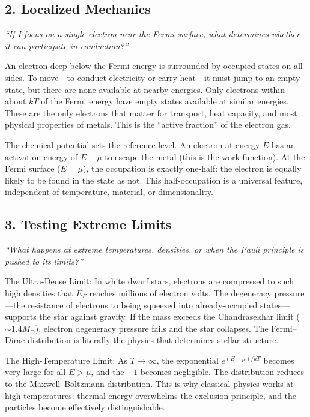 \documentclass[11pt,openright]{book}
\begin{document}
\subsection*{2. Localized Mechanics}
\textit{``If I focus on a single electron near the Fermi surface, what determines whether it can participate in conduction?''}

An electron deep below the Fermi energy is surrounded by occupied states on all sides. To move---to conduct electricity or carry heat---it must jump to an empty state, but there are none available at nearby energies. Only electrons within about $kT$ of the Fermi energy have empty states available at similar energies. These are the only electrons that matter for transport, heat capacity, and most physical properties of metals. This is the ``active fraction'' of the electron gas.

The chemical potential sets the reference level. An electron at energy $E$ has an activation energy of $E - \mu$ to escape the metal (this is the work function). At the Fermi surface ($E = \mu$), the occupation is exactly one-half: the electron is equally likely to be found in the state as not. This half-occupation is a universal feature, independent of temperature, material, or dimensionality.

\subsection*{3. Testing Extreme Limits}
\textit{``What happens at extreme temperatures, densities, or when the Pauli principle is pushed to its limits?''}

The Ultra-Dense Limit: In white dwarf stars, electrons are compressed to such high densities that $E_F$ reaches millions of electron volts. The degeneracy pressure---the resistance of electrons to being squeezed into already-occupied states---supports the star against gravity. If the mass exceeds the Chandrasekhar limit ($\sim 1.4 M_\odot$), electron degeneracy pressure fails and the star collapses. The Fermi--Dirac distribution is literally the physics that determines stellar structure.

The High-Temperature Limit: As $T \to \infty$, the exponential $e^{(E-\mu)/kT}$ becomes very large for all $E > \mu$, and the $+1$ becomes negligible. The distribution reduces to the Maxwell--Boltzmann distribution. This is why classical physics works at high temperatures: thermal energy overwhelms the exclusion principle, and the particles become effectively distinguishable.
\end{document}

